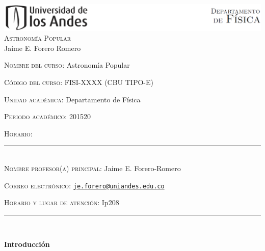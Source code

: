 \documentclass[letterpaper,10pt,onecolumn]{article}
\begin{document}
\begin{center}

\includegraphics[width=490pt]{header.png}\\[0.5cm]

\textsc{\LARGE Astronom\'ia Popular}\\[0.1cm]

\large Jaime E. Forero Romero\\[0.5cm]

\end{center}

\large \noindent\textsc{Nombre del curso:} Astronom\'ia Popular %
 
\noindent\textsc{C\'odigo del curso:} FISI-XXXX (CBU TIPO-E)%

\noindent\textsc{Unidad acad\'emica:} Departamento de F\'isica 

\noindent\textsc{Periodo acad\'emico:} 201520 %

\noindent\textsc{Horario:} %

\noindent\rule{\textwidth}{1pt}\\[-0.3cm]

\normalsize \noindent\textsc{Nombre profesor(a) principal:} Jaime
E. Forero-Romero %

\noindent\textsc{Correo electr\'onico:}
\href{mailto:je.forero@uniandes.edu.co}{\nolinkurl{je.forero@uniandes.edu.co}}

\noindent\textsc{Horario y lugar de atenci\'on:} Ip208 %
\\[-0.1cm]


\noindent\rule{\textwidth}{1pt}\\[-0.1cm]

\addtocounter{mysection}{1}

\noindent\textbf{\large {} \quad
  Introducci\'on}\\[-0.2cm] 
\end{document}
